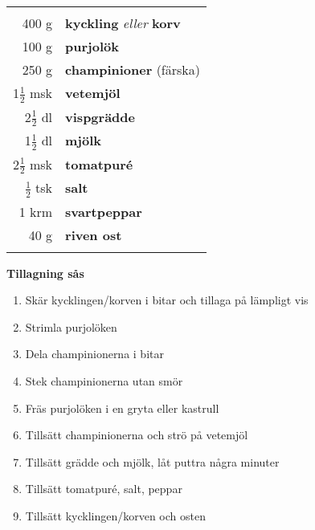 \begin{table}[H]
	\begin{tabular}{rl}
	\hline
	&\\
		400 g & \textbf{kyckling} \textit{eller} \textbf{korv}\\
		100 g & \textbf{purjolök}\\
		250 g & \textbf{champinioner} (färska)\\
		1$\frac{1}{2}$ msk & \textbf{vetemjöl}\\
		2$\frac{1}{2}$ dl & \textbf{vispgrädde}\\
		1$\frac{1}{2}$ dl & \textbf{mjölk}\\
		2$\frac{1}{2}$ msk & \textbf{tomatpuré}\\
		$\frac{1}{2}$ tsk & \textbf{salt}\\
		1 krm & \textbf{svartpeppar}\\
		40 g & \textbf{riven ost}\\
	&\\
	\hline
	\end{tabular}
\end{table}


\begin{multicols*}{2}

\noindent \textbf{Tillagning sås}
\begin{enumerate}
	\itemsep0cm
	\item Skär kycklingen/korven i bitar och tillaga på lämpligt vis
	\item Strimla purjolöken
	\item Dela champinionerna i bitar
	\item Stek champinionerna utan smör
	\item Fräs purjolöken i en gryta eller kastrull
	\item Tillsätt champinionerna och strö på vetemjöl
	\item Tillsätt grädde och mjölk, låt puttra några minuter
	\item Tillsätt tomatpuré, salt, peppar
	\item Tillsätt kycklingen/korven och osten
\end{enumerate}

\end{multicols*}

\clearpage